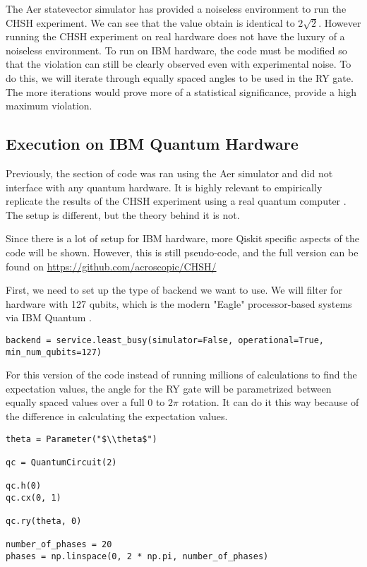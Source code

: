 \documentclass[12pt]{article}
\begin{document}
The Aer statevector simulator has provided a noiseless environment to run the CHSH experiment. We can see that the value obtain is identical to $2\sqrt{2}$. However running the CHSH experiment on real hardware does not have the luxury of a noiseless environment. To run on IBM hardware, the code must be modified so that the violation can still be clearly observed even with experimental noise. To do this, we will iterate through equally spaced angles to be used in the RY gate. The more iterations would prove more of a statistical significance, provide a high maximum violation.



\newpage
\subsection{Execution on IBM Quantum Hardware}
Previously, the section of code was ran using the Aer simulator and did not interface with any quantum hardware. It is highly relevant to empirically replicate the results of the CHSH experiment using a real quantum computer \cite{ibm_quantum}. The setup is different, but the theory behind it is not. 

Since there is a lot of setup for IBM hardware, more Qiskit specific aspects of the code will be shown. However, this is still pseudo-code, and the full version can be found on \url{https://github.com/acroscopic/CHSH/}

First, we need to set up the type of backend we want to use. We will filter for hardware with 127 qubits, which is the modern "Eagle" processor-based systems via IBM Quantum \cite{ibm_quantum}.
\begin{lstlisting}[style=python]
backend = service.least_busy(simulator=False, operational=True, min_num_qubits=127)
\end{lstlisting}

For this version of the code instead of running millions of calculations to find the expectation values, the angle for the RY gate will be parametrized between equally spaced values over a full 0 to $2\pi$ rotation. It can do it this way because of the difference in calculating the expectation values. 

\begin{lstlisting}[style=python]
theta = Parameter("$\\theta$")

qc = QuantumCircuit(2)

qc.h(0)
qc.cx(0, 1)

qc.ry(theta, 0)

number_of_phases = 20
phases = np.linspace(0, 2 * np.pi, number_of_phases)
\end{lstlisting}
\end{document}
